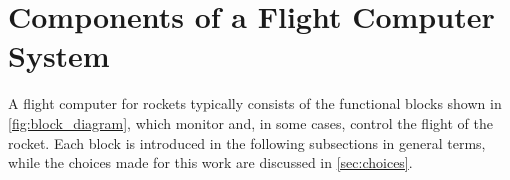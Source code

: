 
\section{Components of a Flight Computer System}
\label{sec:components}

A flight computer for rockets typically consists of the functional blocks shown in \cref{fig:block_diagram}, which monitor and, in some cases, control the flight of the rocket. Each block is introduced in the following subsections in general terms, while the choices made for this work are discussed in \cref{sec:choices}.

